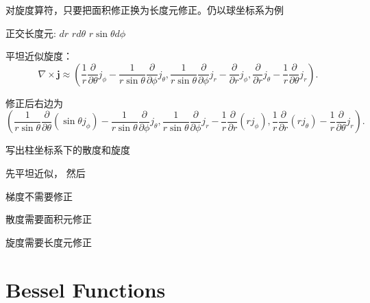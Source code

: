 \documentclass[CJK]{beamer}
\begin{document}
\begin{frame}
  \bch
  对旋度算符，只要把面积修正换为长度元修正。仍以球坐标系为例

  \skiplines

  正交长度元:
  \emini
  $dr$
  \emini
  $rd\theta$
  \emini
  $r\sin\theta d\phi$
  \emini

  
  \skipline
  
  平坦近似旋度：
  $$\nabla\times \mathbf{j} \approx \left( \frac{1}{r}\frac{\partial}{\partial \theta} j_\phi -  \frac{1}{r\sin\theta}\frac{\partial}{\partial \phi} j_\theta ,  \frac{1}{r\sin\theta}\frac{\partial}{\partial \phi} j_r -  \frac{\partial}{\partial r} j_\phi, \frac{\partial}{\partial r} j_\theta-  \frac{1}{r}\frac{\partial}{\partial \theta} j_r\right). $$

  修正后右边为{\small 
  $$\left( \frac{1}{r\sin\theta}\frac{\partial}{\partial \theta} (\sin\theta j_\phi) -  \frac{1}{r\sin\theta}\frac{\partial}{\partial \phi} j_\theta ,  \frac{1}{r\sin\theta}\frac{\partial}{\partial \phi} j_r - \frac{1}{r} \frac{\partial}{\partial r} (rj_\phi), \frac{1}{r}\frac{\partial}{\partial r} (rj_\theta)-  \frac{1}{r}\frac{\partial}{\partial \theta} j_r\right). $$}
  
  \ech
\end{frame}



\begin{frame}
  \bch
  
  写出柱坐标系下的散度和旋度
  \ech
\end{frame}

\begin{frame}
  \bch
  先平坦近似， 然后
  \bitem
\item{梯度不需要修正}
\item{散度需要面积元修正}
\item{旋度需要长度元修正}
  \eitem
  \ech
\end{frame}


\section{Bessel Functions}
\end{document}
